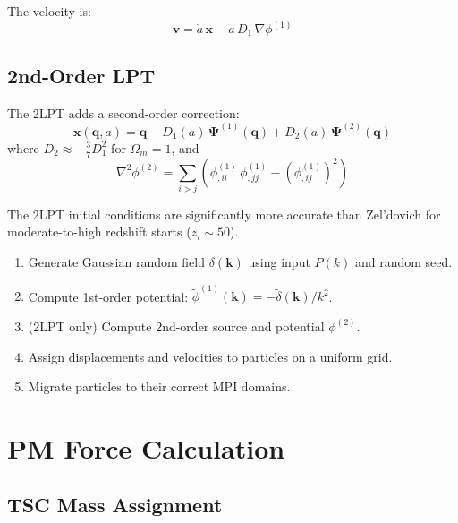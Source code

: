 \documentclass[11pt,fleqn]{book}
\begin{document}
The velocity is:
\begin{equation}
  \mathbf{v} = \dot{a}\,\mathbf{x} - a\,\dot{D}_1\,\nabla\phi^{(1)}
\end{equation}

\section{2nd-Order LPT}

The 2LPT adds a second-order correction:
\begin{equation}
  \mathbf{x}(\mathbf{q}, a) = \mathbf{q} - D_1(a)\,\boldsymbol{\Psi}^{(1)}(\mathbf{q}) + D_2(a)\,\boldsymbol{\Psi}^{(2)}(\mathbf{q})
\end{equation}
where $D_2 \approx -\frac{3}{7}D_1^2$ for $\Omega_m = 1$, and
\begin{equation}
  \nabla^2\phi^{(2)} = \sum_{i>j}\left(\phi^{(1)}_{,ii}\,\phi^{(1)}_{,jj} - (\phi^{(1)}_{,ij})^2\right)
\end{equation}

The 2LPT initial conditions are significantly more accurate than Zel'dovich for moderate-to-high redshift starts ($z_i \sim 50$).

\begin{algorithm}[IC Generation]
\begin{enumerate}[leftmargin=2em]
  \item Generate Gaussian random field $\delta(\mathbf{k})$ using input $P(k)$ and random seed.
  \item Compute 1st-order potential: $\tilde\phi^{(1)}(\mathbf{k}) = -\tilde\delta(\mathbf{k})/k^2$.
  \item (2LPT only) Compute 2nd-order source and potential $\phi^{(2)}$.
  \item Assign displacements and velocities to particles on a uniform grid.
  \item Migrate particles to their correct MPI domains.
\end{enumerate}
\end{algorithm}


\chapter{PM Force Calculation}
\label{ch:pm}

\section{TSC Mass Assignment}
\end{document}
